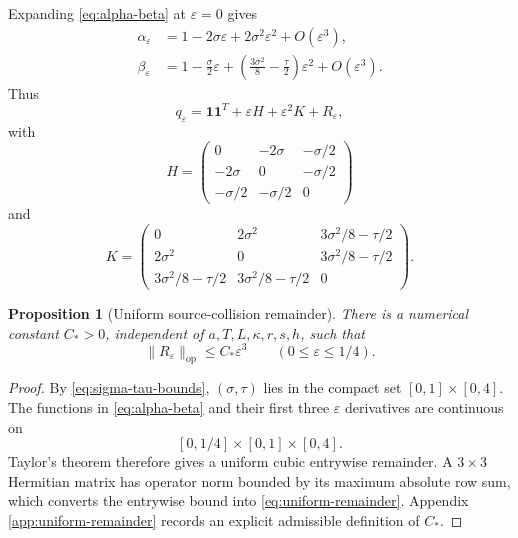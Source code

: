 \documentclass[11pt]{article}
\newtheorem{proposition}[theorem]{Proposition}
\newcommand{\one}{\mathbf 1}
\newcommand{\eps}{\varepsilon}
\newcommand{\norm}[1]{\lVert #1\rVert}
\begin{document}
Expanding \eqref{eq:alpha-beta} at $\eps=0$ gives
\begin{align}
  \alpha_\eps
  &=1-2\sigma\eps+2\sigma^2\eps^2+O(\eps^3),
  \label{eq:alpha-expansion}\\
  \beta_\eps
  &=1-\frac{\sigma}{2}\eps
  +\left(\frac{3\sigma^2}{8}-\frac{\tau}{2}\right)\eps^2
  +O(\eps^3).
  \label{eq:beta-expansion}
\end{align}
Thus
\begin{equation}
  q_\eps=\one\one^T+\eps H+\eps^2K+R_\eps,
  \label{eq:q-HK}
\end{equation}
with
\begin{equation}
H=
\begin{pmatrix}
0&-2\sigma&-\sigma/2\\
-2\sigma&0&-\sigma/2\\
-\sigma/2&-\sigma/2&0
\end{pmatrix}
\label{eq:H-explicit}
\end{equation}
and
\begin{equation}
K=
\begin{pmatrix}
0&2\sigma^2&3\sigma^2/8-\tau/2\\
2\sigma^2&0&3\sigma^2/8-\tau/2\\
3\sigma^2/8-\tau/2&3\sigma^2/8-\tau/2&0
\end{pmatrix}.
\label{eq:K-explicit}
\end{equation}

\begin{proposition}[Uniform source-collision remainder]
\label{prop:uniform-remainder}
There is a numerical constant $C_*>0$, independent of $a,T,L,\kappa,r,s,h$, such that
\begin{equation}
  \norm{R_\eps}_{\mathrm{op}}\le C_*\eps^3
  \qquad(0\le\eps\le1/4).
  \label{eq:uniform-remainder}
\end{equation}
\end{proposition}

\begin{proof}
By \eqref{eq:sigma-tau-bounds}, $(\sigma,\tau)$ lies in the compact set $[0,1]\times[0,4]$.  The functions in \eqref{eq:alpha-beta} and their first three $\eps$ derivatives are continuous on
\[
  [0,1/4]\times[0,1]\times[0,4].
\]
Taylor's theorem therefore gives a uniform cubic entrywise remainder.  A $3\times3$ Hermitian matrix has operator norm bounded by its maximum absolute row sum, which converts the entrywise bound into \eqref{eq:uniform-remainder}.  Appendix \ref{app:uniform-remainder} records an explicit admissible definition of $C_*$.
\end{proof}
\end{document}

